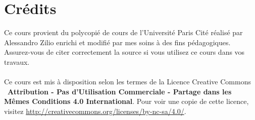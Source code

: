 \documentclass{article}
\begin{document}



\newpage
\tableofcontents
\section*{Crédits}
Ce cours provient du polycopié de cours de l'Université Paris Cité réalisé par Alessandro Zilio enrichi et modifié par mes soins à des fins pédagogiques. Assurez-vous de citer correctement la source si vous utilisez ce cours dans vos travaux.\\\\
Ce cours est mis à disposition selon les termes de la Licence Creative Commons \ccbyncsa\ \textbf{Attribution - Pas d'Utilisation Commerciale - Partage dans les Mêmes Conditions 4.0 International}. 
Pour voir une copie de cette licence, visitez \url{http://creativecommons.org/licenses/by-nc-sa/4.0/}.
\end{document}
